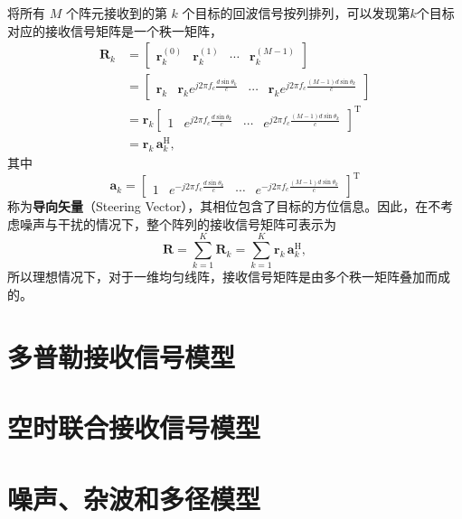 将所有 \(M\) 个阵元接收到的第 \(k\) 个目标的回波信号按列排列，可以发现第\( k \)个目标对应的接收信号矩阵是一个秩一矩阵，
\[
    \begin{aligned}
        \mathbf{R}_k
         & = \begin{bmatrix}
                 \bm{r}_k^{(0)} & \bm{r}_k^{(1)} & \cdots & \bm{r}_k^{(M-1)}
             \end{bmatrix}                                                           \\
         & = \begin{bmatrix}
                 \bm{r}_k & \bm{r}_k e^{j 2 \pi f_c \frac{d \sin\theta_k}{c}} & \cdots & \bm{r}_k e^{j 2 \pi f_c \frac{(M-1) d \sin\theta_k}{c}}
             \end{bmatrix} \\
         & = \bm{r}_k
        \begin{bmatrix}
            1 & e^{j 2 \pi f_c \frac{d \sin\theta_k}{c}} & \cdots & e^{j 2 \pi f_c \frac{(M-1) d \sin\theta_k}{c}}
        \end{bmatrix}^{\mathrm{T}}                               \\
         & = \bm{r}_k \, \bm{a}_k^{\mathrm{H}},
    \end{aligned}
\]
其中
\[
    \bm{a}_k =
    \begin{bmatrix}
        1 & e^{-j 2 \pi f_c \frac{d \sin\theta_k}{c}} & \cdots & e^{-j 2 \pi f_c \frac{(M-1) d \sin\theta_k}{c}}
    \end{bmatrix}^{\mathrm{T}}
\]
称为\textbf{导向矢量}（Steering Vector），其相位包含了目标的方位信息。因此，在不考虑噪声与干扰的情况下，整个阵列的接收信号矩阵可表示为
\[
    \mathbf{R}
    = \sum_{k=1}^{K} \mathbf{R}_k
    = \sum_{k=1}^{K} \bm{r}_k \, \bm{a}_k^{\mathrm{H}},
\]
所以理想情况下，对于一维均匀线阵，接收信号矩阵是由多个秩一矩阵叠加而成的。


\section{多普勒接收信号模型}

\section{空时联合接收信号模型}

\section{噪声、杂波和多径模型}
